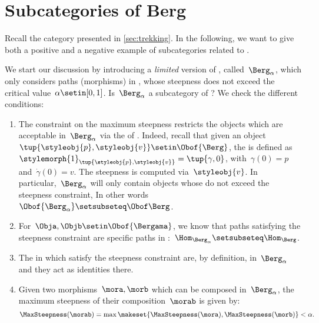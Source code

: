 
\section{Subcategories of Berg}
\label{sec:subcat_berg}

Recall the category \Berg presented in \cref{sec:trekking}.
In the following, we want to give both a positive and a negative example of subcategories related to \Berg.

We start our discussion by introducing a \emph{limited} version of \Berg, called~$\Berg_\alpha$, which only considers paths (morphisms) in \Berg, whose steepness does not exceed the critical value~$\alpha\setin [0,1]$.
Is~$\Berg_\alpha$ a subcategory of \Berg?
We check the different conditions:
\begin{enumerate}
    \item The constraint on the maximum steepness restricts the objects which are acceptable in~$\Berg_\alpha$ via the   of \Berg.
          Indeed, recall that given an object~$\tup{\styleobj{p},\styleobj{v}}\setin \Obof{\Berg}$, the  is defined as~$\stylemorph{1}_{\tup{\styleobj{p},\styleobj{v}}}=\tup{\gamma,0}$, with~$\gamma(0)=p$ and~$\dot{\gamma}(0)=v$.
          The steepness is computed via~$\styleobj{v}$.
          In particular,~$\Berg_\alpha$ will only contain objects whose   do not exceed the steepness constraint, In other words~$\Obof{\Berg_\alpha} \setsubseteq \Obof\Berg$.
    \item For~$\Obja,\Objb\setin \Obof{\Bergama}$, we know that paths satisfying the steepness constraint are specific paths in \Berg:~$\Hom_{\Berg_\alpha}\setsubseteq \Hom_{\Berg}$.
    \item The   in \Berg which satisfy the steepness constraint are, by definition, in~$\Berg_\alpha$ and they act as identities there.
    \item Given two morphisms~$\mora,\morb$ which can be composed in~$\Berg_\alpha$, the maximum steepness of their composition~$\morab$ is given by:
          \begin{equation}
              \MaxSteepness(\morab)
              =
              \max \makeset{
                  \MaxSteepness(\mora),
                  \MaxSteepness(\morb)
              }
              <
              \alpha.
          \end{equation}
\end{enumerate}

